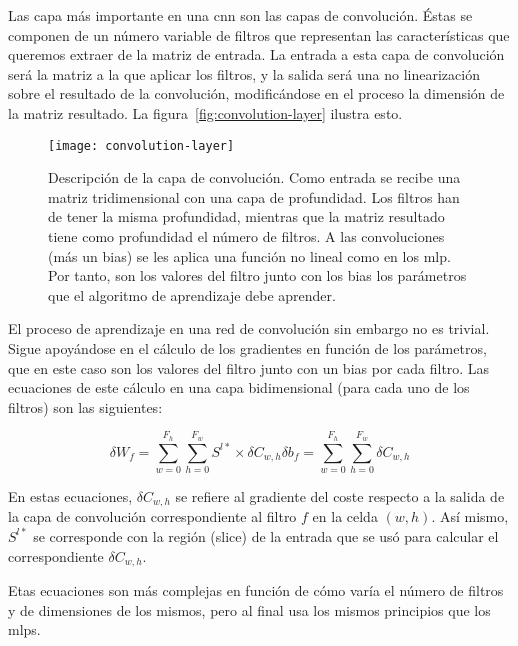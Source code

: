 Las capa más importante en una \ac{cnn} son las capas de convolución. Éstas se componen de un número variable de filtros que representan las características que queremos extraer de la matriz de entrada. La entrada a esta capa de convolución será la matriz a la que aplicar los filtros, y la salida será una no linearización sobre el resultado de la convolución, modificándose en el proceso la dimensión de la matriz resultado. La figura~\ref{fig:convolution-layer} ilustra esto.

\begin{figure}
	\centering
	\texttt{[image: convolution-layer]}
	\caption[Descripción de la capa de convolución]{Descripción de la capa de convolución. Como entrada se recibe una matriz tridimensional con una capa de profundidad. Los filtros han de tener la misma profundidad, mientras que la matriz resultado tiene como profundidad el número de filtros. A las convoluciones (más un bias) se les aplica una función no lineal como en los \ac{mlp}. Por tanto, son los valores del filtro junto con los bias los parámetros que el algoritmo de aprendizaje debe aprender.}
	\label{fig:cnn-gconvolutional-layer}
\end{figure}

El proceso de aprendizaje en una red de convolución sin embargo no es trivial. Sigue apoyándose en el cálculo de los gradientes en función de los parámetros, que en este caso son los valores del filtro junto con un bias por cada filtro. Las ecuaciones de este cálculo en una capa bidimensional (para cada uno de los filtros) son las siguientes:

\begin{subequations}
	\begin{equation}
		\delta W_f = \sum_{w=0}^{F_h} \sum_{h=0}^{F_w} S^{l*} \times \delta C_{w,h} \label{eq:cnn-error-weights}
	\end{equation}
	\begin{equation}
		\delta b_f = \sum_{w=0}^{F_h} \sum_{h=0}^{F_w} \delta C_{w,h} \label{eq:cnn-error-biases}
	\end{equation}
\end{subequations}

En estas ecuaciones, $\delta C_{w,h}$ se refiere al gradiente del coste respecto a la salida de la capa de convolución correspondiente al filtro $f$ en la celda $(w, h)$. Así mismo, $S^{l*}$ se corresponde con la región (slice) de la entrada que se usó para calcular el correspondiente $\delta C_{w,h}$.

Etas ecuaciones son más complejas en función de cómo varía el número de filtros y de dimensiones de los mismos, pero al final usa los mismos principios que los \acp{mlp}.

